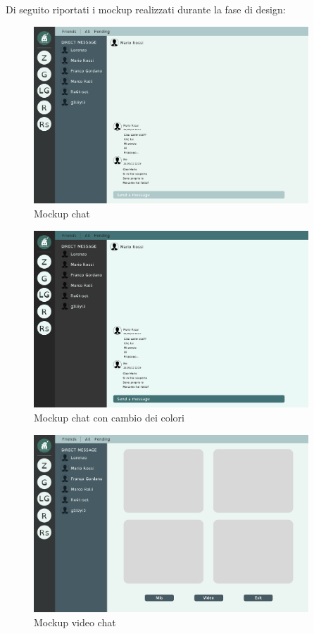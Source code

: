 Di seguito riportati i mockup realizzati durante la fase di design:

\begin{figure}[htbp]
    \centering
    \includegraphics[angle=-90,width=0.92\textwidth]{img/mk2.jpg}
    \caption{Mockup chat}
    \label{fig:mockup2}
\end{figure}

\begin{figure}[htbp]
    \centering
    \includegraphics[angle=-90,width=0.92\textwidth]{img/mk3.jpg}
    \caption{Mockup chat con cambio dei colori}
    \label{fig:mockup3}
\end{figure}

\begin{figure}[htbp]
    \centering
    \includegraphics[angle=-90,width=0.92\textwidth]{img/mk4.jpg}
    \caption{Mockup video chat}
    \label{fig:mockup1}
\end{figure}

